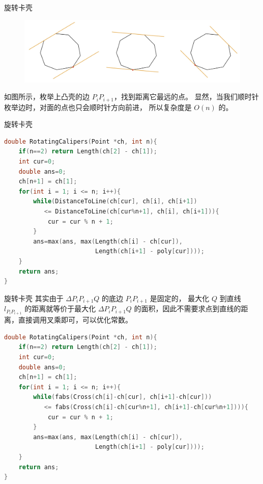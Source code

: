 \documentclass{beamer}
\begin{document}
\begin{frame}{旋转卡壳}
    \small
    \begin{figure}[H]
        \centering
        \includegraphics[width=\textwidth]{pic/rotation.jpg}
    \end{figure}
    如图所示，枚举上凸壳的边 $P_iP_{i+1}$，找到距离它最远的点。
    显然，当我们顺时针枚举边时，对面的点也只会顺时针方向前进，
    所以复杂度是 $O(n)$ 的。
\end{frame}

\begin{frame}[fragile]{旋转卡壳}
    \small
    \begin{lstlisting}[language=c++]
double RotatingCalipers(Point *ch, int n){
    if(n==2) return Length(ch[2] - ch[1]);
    int cur=0;
    double ans=0;
    ch[n+1] = ch[1];
    for(int i = 1; i <= n; i++){
        while(DistanceToLine(ch[cur], ch[i], ch[i+1]) 
           <= DistanceToLine(ch[cur%n+1], ch[i], ch[i+1])){
            cur = cur % n + 1;
        }
        ans=max(ans, max(Length(ch[i] - ch[cur]), 
                         Length(ch[i+1] - poly[cur])));
    }
    return ans;
}
    \end{lstlisting}
\end{frame}

\begin{frame}[fragile]{旋转卡壳}
    \footnotesize
    其实由于 $\Delta P_iP_{i+1}Q$ 的底边 $P_{i}P_{i+1}$ 是固定的，
    最大化 $Q$ 到直线 $l_{P_iP_{i+1}}$ 的距离就等价于最大化 $\Delta P_iP_{i+1}Q$
    的面积，因此不需要求点到直线的距离，直接调用叉乘即可，可以优化常数。
    \begin{lstlisting}[language=c++]
double RotatingCalipers(Point *ch, int n){
    if(n==2) return Length(ch[2] - ch[1]);
    int cur=0;
    double ans=0;
    ch[n+1] = ch[1];
    for(int i = 1; i <= n; i++){
        while(fabs(Cross(ch[i]-ch[cur], ch[i+1]-ch[cur])) 
           <= fabs(Cross(ch[i]-ch[cur%n+1], ch[i+1]-ch[cur%n+1]))){
            cur = cur % n + 1;
        }
        ans=max(ans, max(Length(ch[i] - ch[cur]), 
                         Length(ch[i+1] - poly[cur])));
    }
    return ans;
}
    \end{lstlisting}
\end{frame}
\end{document}
